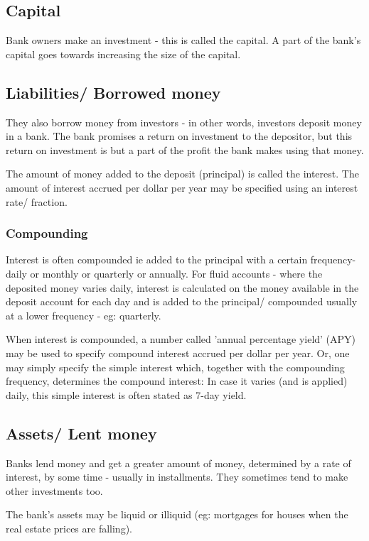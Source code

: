 \documentclass[oneside, article]{memoir}
\begin{document}
\subsection{Capital}
Bank owners make an investment - this is called the capital. A part of the bank's capital goes towards increasing the size of the capital.

\subsection{Liabilities/ Borrowed money}
They also borrow money from investors - in other words, investors deposit money in a bank. The bank promises a return on investment to the depositor, but this return on investment is but a part of the profit the bank makes using that money.

The amount of money added to the deposit (principal) is called the interest. The amount of interest accrued per dollar per year may be specified using an interest rate/ fraction.

\subsubsection{Compounding}
Interest is often compounded ie added to the principal with a certain frequency- daily or monthly or quarterly or annually. For fluid accounts - where the deposited money varies daily, interest is calculated on the money available in the deposit account for each day and is added to the principal/ compounded usually at a lower frequency - eg: quarterly.

When interest is compounded, a number called 'annual percentage yield' (APY) may be used to specify compound interest accrued per dollar per year. Or, one may simply specify the simple interest which, together with the compounding frequency, determines the compound interest: In case it varies (and is applied) daily, this simple interest is often stated  as 7-day yield.

\subsection{Assets/ Lent money}
Banks lend money and get a greater amount of money, determined by a rate of interest, by some time - usually in installments. They sometimes tend to make other investments too.

The bank's assets may be liquid or illiquid (eg: mortgages for houses when the real estate prices are falling).
\end{document}
